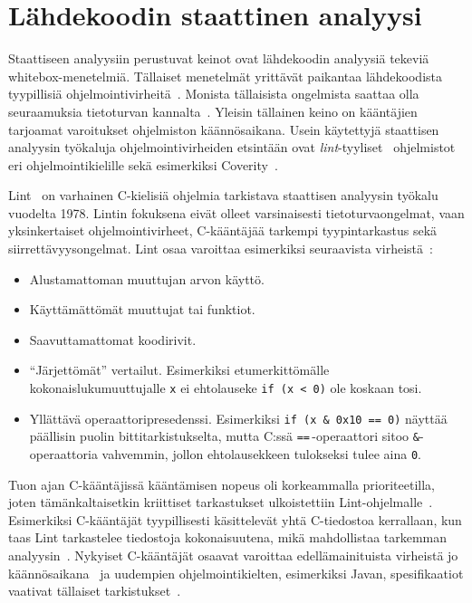 \section{Lähdekoodin staattinen analyysi}
\label{StaattinenAnalyysi}

Staattiseen analyysiin perustuvat keinot ovat lähdekoodin analyysiä tekeviä whitebox-menetelmiä.
Tällaiset menetelmät yrittävät paikantaa lähdekoodista tyypillisiä ohjelmointivirheitä~\cite[22.3]{Sommerville}.
Monista tällaisista ongelmista saattaa olla seuraamuksia tietoturvan kannalta~\cite{StaticCodeAnalysis}.
Yleisin tällainen keino on kääntäjien tarjoamat varoitukset ohjelmiston käännösaikana.
Usein käytettyjä staattisen analyysin työkaluja ohjelmointivirheiden etsintään
ovat \emph{lint}-tyyliset~\cite{Lint} ohjelmistot eri ohjelmointikielille sekä
esimerkiksi Coverity~\cite{Coverity}.


Lint~\cite{Lint} on varhainen C-kielisiä ohjelmia tarkistava staattisen analyysin työkalu vuodelta 1978.
Lintin fokuksena eivät olleet varsinaisesti tietoturvaongelmat,
vaan yksinkertaiset ohjelmointivirheet, C-kääntäjää tarkempi tyypintarkastus sekä siirrettävyysongelmat.
Lint osaa varoittaa esimerkiksi seuraavista virheistä~\cite{Lint}:

\begin{itemize}
    \item Alustamattoman muuttujan arvon käyttö.
    \item Käyttämättömät muuttujat tai funktiot.
    \item Saavuttamattomat koodirivit.
    \item ``Järjettömät'' vertailut.
           Esimerkiksi etumerkittömälle kokonaislukumuuttujalle \texttt{x} ei ehtolauseke
           \texttt{if (x < 0)} ole koskaan tosi.
   \item Yllättävä operaattoripresedenssi.
         Esimerkiksi \texttt{if (x \& 0x10 == 0)} näyttää päällisin puolin bittitarkistukselta,
         mutta C:ssä \texttt{==}\,-operaattori sitoo \texttt{\&}-operaattoria vahvemmin,
         jollon ehtolausekkeen tulokseksi tulee aina \texttt{0}.
\end{itemize}

Tuon ajan C-kääntäjissä kääntämisen nopeus oli korkeammalla prioriteetilla,
joten tämänkaltaisetkin kriittiset tarkastukset ulkoistettiin Lint-ohjelmalle~\cite{Lint}.
Esimerkiksi C-kääntäjät tyypillisesti käsittelevät yhtä C-tiedostoa kerrallaan,
kun taas Lint tarkastelee tiedostoja kokonaisuutena,
mikä mahdollistaa tarkemman analyysin~\cite{Lint}.
Nykyiset C-kääntäjät osaavat varoittaa e\-del\-lä\-mai\-ni\-tuis\-ta virheistä
jo käännösaikana~\cite{SecurityRootOfTheProblem} ja uudempien ohjelmointikielten,
esimerkiksi Javan, spesifikaatiot vaativat tällaiset tarkistukset~\cite[22.3]{Sommerville}.

